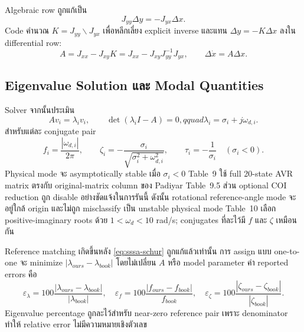 \documentclass[12pt,a4paper]{article}
\begin{document}
Algebraic row ถูกแก้เป็น
\begin{equation}
J_{yy}\Delta y=-J_{yx}\Delta x.
\end{equation}
Code คำนวณ $K=J_{yy}\backslash J_{yx}$ เพื่อหลีกเลี่ยง explicit inverse และแทน $\Delta y=-K\Delta x$ ลงใน differential row:
\begin{equation}
A=J_{xx}-J_{xy}K
=J_{xx}-J_{xy}J_{yy}^{-1}J_{yx},\qquad
\Delta\dot x=A\Delta x.
\label{eq:sssa-schur}
\end{equation}

\subsection{Eigenvalue Solution และ Modal Quantities}

Solver จากนั้นประเมิน
\begin{equation}
A v_i=\lambda_i v_i,\qquad
\det(\lambda_iI-A)=0,qquad \lambda_i=\sigma_i+j\omega_{d,i}.
\end{equation}
สำหรับแต่ละ conjugate pair
\begin{equation}
f_i=\frac{|\omega_{d,i}|}{2\pi},\qquad
\zeta_i=-\frac{\sigma_i}{\sqrt{\sigma_i^2+\omega_{d,i}^2}},\qquad
\tau_i=-\frac{1}{\sigma_i}\quad(\sigma_i<0).
\label{eq:sssa-modal-metrics}
\end{equation}
Physical mode จะ asymptotically stable เมื่อ $\sigma_i<0$ Table~9 ใช้ full 20-state AVR matrix ตรงกับ original-matrix column ของ Padiyar Table~9.5 ส่วน optional COI reduction ถูก disable อย่างชัดแจ้งในการรันนี้ ดังนั้น rotational reference-angle mode จะอยู่ใกล้ origin และไม่ถูก misclassify เป็น unstable physical mode Table~10 เลือก positive-imaginary roots ด้วย $1<\omega_d<10$ rad/s; conjugates ที่ละไว้มี $f$ และ $\zeta$ เหมือนกัน

Reference matching เกิดขึ้นหลัง \eqref{eq:sssa-schur} ถูกแก้แล้วเท่านั้น การ assign แบบ one-to-one จะ minimize $|\lambda_{ours}-\lambda_{book}|$ โดยไม่เปลี่ยน $A$ หรือ model parameter ค่า reported errors คือ
\begin{equation}
\varepsilon_\lambda=
100\frac{|\lambda_{ours}-\lambda_{book}|}{|\lambda_{book}|},\quad
\varepsilon_f=100\frac{|f_{ours}-f_{book}|}{f_{book}},\quad
\varepsilon_\zeta=
100\frac{|\zeta_{ours}-\zeta_{book}|}{|\zeta_{book}|}.
\end{equation}
Eigenvalue percentage ถูกละไว้สำหรับ near-zero reference pair เพราะ denominator ทำให้ relative error ไม่มีความหมายเชิงตัวเลข

\begin{table}[H]\centering\small
\caption{Eigenvalue comparison: ค่าจากหนังสือ ($\lambda_{book}$, Padiyar Table~9.5) เทียบกับ in-house computed values ($\lambda_{ours}$) พร้อม absolute difference $|\Delta\lambda|$ และ swing-mode labels ค่า percentage error ถูกละไว้สำหรับ near-zero reference-angle modes เพราะไม่มีความหมายเชิงตัวเลข และ 18 non-reference modes ทั้งหมด stable}




\resizebox{\textwidth}{!}{}
\end{table}
\end{document}
